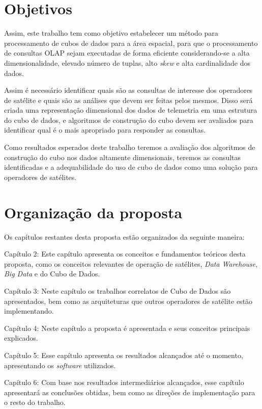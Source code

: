 \section{Objetivos}\label{ch:intro:obj}

{\color{cerulean}

Assim, este trabalho tem como objetivo estabelecer um método para processamento de cubos de dados para a área espacial, para que o processamento de consultas OLAP sejam executadas de forma eficiente considerando-se a alta dimensionalidade, elevado número de tuplas, alto \textit{skew} e alta cardinalidade dos dados.

Assim é necessário identificar quais são as consultas de interesse dos operadores de satélite e quais são as análises que devem ser feitas pelos mesmos.
Disso será criada uma representação dimensional dos dados de telemetria em uma estrutura do cubo de dados, e  algoritmos de construção do cubo devem ser avaliados para identificar qual é o mais apropriado para responder as consultas.

Como resultados esperados deste trabalho teremos a avaliação dos algoritmos de construção do cubo nos dados altamente dimensionais, teremos as consultas identificadas e a adequabilidade do uso de cubo de dados como uma solução para operadores de satélites.

}

\section{Organização da proposta}\label{ch:intro:org}

Os capítulos restantes desta proposta estão organizados da seguinte maneira:

\begin{itemize}
	\item{Capítulo 2}: Este capítulo apresenta os conceitos e fundamentos teóricos desta proposta, como os conceitos relevantes de operação de satélites, \textit{Data Warehouse}, \textit{Big Data} e do Cubo de Dados.
	\item{Capítulo 3}: Neste capítulo os trabalhos correlatos de Cubo de Dados são apresentados, bem como as arquiteturas que outros operadores de satélite estão implementando.
	\item{Capítulo 4}: Neste capítulo a proposta é apresentada e seus conceitos principais explicados.
{\color{cerulean}
  \item{Capítulo 5}: Esse capítulo apresenta os resultados alcançados até o momento, apresentando os \textit{software} utilizados.
}
	\item{Capítulo 6}: Com base nos resultados intermediários alcançados, esse capítulo apresentará as conclusões obtidas, bem como as direções de implementação para o resto do trabalho.
\end{itemize}

